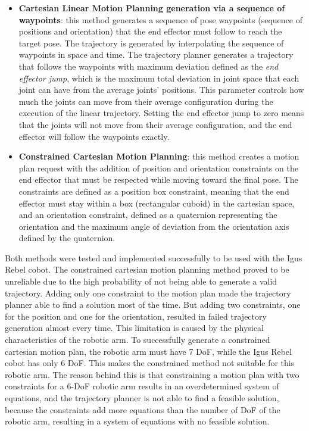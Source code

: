 \begin{itemize}
    \item \textbf{Cartesian Linear Motion Planning generation via a sequence of waypoints}:
    this method generates a sequence of pose waypoints (sequence of positions and orientation) that the
    end effector must follow to reach the target pose. The trajectory is generated by interpolating
    the sequence of waypoints in space and time. The trajectory planner generates a trajectory that
    follows the waypoints with maximum deviation defined as the \textit{end effector jump}, which is
    the maximum total deviation in joint space that each joint can have from the average joints' positions.
    This parameter controls how much the joints can move from their average configuration during the 
    execution of the linear trajectory. Setting the end effector jump to zero means that the joints
    will not move from their average configuration, and the end effector will follow the waypoints
    exactly.
    \item \textbf{Constrained Cartesian Motion Planning}: this method creates a motion plan request with the
    addition of position and orientation constraints on the end effector that must be respected while moving
    toward the final pose. The constraints are defined as a position box constraint, meaning that the end 
    effector must stay within a box (rectangular cuboid) in the cartesian space, and an orientation constraint,
    defined as a quaternion representing the orientation and the maximum angle of deviation from the
    orientation axis defined by the quaternion.
\end{itemize}

Both methods were tested and implemented successfully to be used with the Igus Rebel cobot.
The constrained cartesian motion planning method proved to be unreliable due to the high probability
of not being able to generate a valid trajectory. Adding only one constraint to the motion plan made
the trajectory planner able to find a solution most of the time. But adding two constraints, one for 
the position and one for the orientation, resulted in failed trajectory generation almost every time.
This limitation is caused by the physical characteristics of the robotic arm. To successfully generate
a constrained cartesian motion plan, the robotic arm must have 7 DoF, while the Igus Rebel cobot has only 6 DoF.
This makes the constrained method not suitable for this robotic arm.
The reason behind this is that constraining a motion plan 
with two constraints for a 6-DoF robotic arm results in an overdetermined system of equations, and the
trajectory planner is not able to find a feasible solution, because the constraints add more equations 
than the number of DoF of the robotic arm, resulting in a system of equations with no feasible solution.

